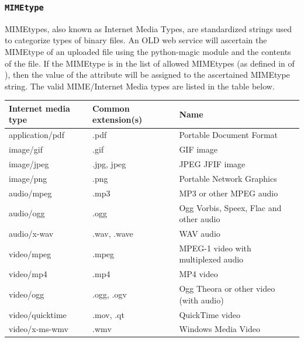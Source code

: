 \documentclass[letterpaper,10pt,english]{sphinxmanual}
\begin{document}
\subsubsection{\texttt{MIMEtype}}
\label{datastructure:mimetype}
MIMEtypes, also known as Internet Media Types, are standardized strings used to
categorize types of binary files.  An OLD web service will ascertain the
MIMEtype of an uploaded file using the python-magic module and the contents of
the file.  If the MIMEtype is in the list of allowed MIMEtypes (as defined in
 of ), then the value of the 
attribute will be assigned to the ascertained MIMEtype string.  The valid
MIME/Internet Media types are listed in the table below.

\begin{tabulary}{\linewidth}{|L|L|L|}
\hline
\textbf{
Internet media type
} & \textbf{
Common extension(s)
} & \textbf{
Name
}\\\hline

application/pdf
 & 
.pdf
 & 
Portable Document Format
\\\hline

image/gif
 & 
.gif
 & 
GIF image
\\\hline

image/jpeg
 & 
.jpg, jpeg
 & 
JPEG JFIF image
\\\hline

image/png
 & 
.png
 & 
Portable Network Graphics
\\\hline

audio/mpeg
 & 
.mp3
 & 
MP3 or other MPEG audio
\\\hline

audio/ogg
 & 
.ogg
 & 
Ogg Vorbis, Speex, Flac and other audio
\\\hline

audio/x-wav
 & 
.wav, .wave
 & 
WAV audio
\\\hline

video/mpeg
 & 
.mpeg
 & 
MPEG-1 video with multiplexed audio
\\\hline

video/mp4
 & 
.mp4
 & 
MP4 video
\\\hline

video/ogg
 & 
.ogg, .ogv
 & 
Ogg Theora or other video (with audio)
\\\hline

video/quicktime
 & 
.mov, .qt
 & 
QuickTime video
\\\hline

video/x-ms-wmv
 & 
.wmv
 & 
Windows Media Video
\\\hline
\end{tabulary}
\end{document}
